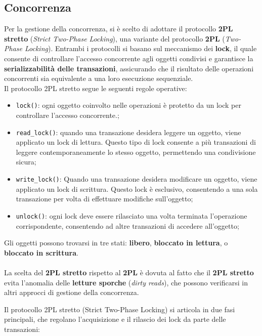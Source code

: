 \subsection{Concorrenza}

Per la gestione della concorrenza, si è scelto di adottare il protocollo \textbf{2PL stretto} (\textit{Strict Two-Phase Locking}), una variante del protocollo \textbf{2PL} (\textit{Two-Phase Locking}). Entrambi i protocolli si basano sul meccanismo dei \textbf{lock}, il quale consente di controllare l'accesso concorrente agli oggetti condivisi e garantisce la \textbf{serializzabilità delle transazioni}, assicurando che il risultato delle operazioni concorrenti sia equivalente a una loro esecuzione sequenziale.
\noindent
\\Il protocollo 2PL stretto segue le seguenti regole operative:


\begin{itemize}
    \item \texttt{lock()}: ogni oggetto coinvolto nelle operazioni è protetto da un lock per controllare l'accesso concorrente.;
    \item \texttt{read\_lock()}: quando una transazione desidera leggere un oggetto, viene applicato un lock di lettura. Questo tipo di lock consente a più transazioni di leggere contemporaneamente lo stesso oggetto, permettendo una condivisione sicura;
    \item \texttt{write\_lock()}: Quando una transazione desidera modificare un oggetto, viene applicato un lock di scrittura. Questo lock è esclusivo, consentendo a una sola transazione per volta di effettuare modifiche sull’oggetto;
    \item \texttt{unlock()}: ogni lock deve essere rilasciato una volta terminata l'operazione corrispondente, consentendo ad altre transazioni di accedere all’oggetto;
\end{itemize}

\noindent
Gli oggetti possono trovarsi in tre stati: \textbf{libero}, \textbf{bloccato in lettura}, o \textbf{bloccato in scrittura}.\\
\noindent \\
La scelta del \textbf{2PL stretto} rispetto al \textbf{2PL} è dovuta al fatto che il \textbf{2PL stretto} evita l'anomalia delle \textbf{letture sporche} (\textit{dirty reads}), che possono verificarsi in altri approcci di gestione della concorrenza.

Il protocollo 2PL stretto (Strict Two-Phase Locking) si articola in due fasi principali, che regolano l'acquisizione e il rilascio dei lock da parte delle transazioni:

